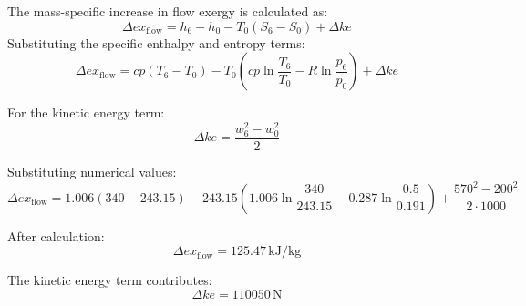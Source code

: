 The mass-specific increase in flow exergy is calculated as:  
\[
\Delta ex_{\text{flow}} = h_6 - h_0 - T_0(S_6 - S_0) + \Delta ke
\]  
Substituting the specific enthalpy and entropy terms:  
\[
\Delta ex_{\text{flow}} = cp(T_6 - T_0) - T_0 \left( cp \ln \frac{T_6}{T_0} - R \ln \frac{p_6}{p_0} \right) + \Delta ke
\]  

For the kinetic energy term:  
\[
\Delta ke = \frac{w_6^2 - w_0^2}{2}
\]  

Substituting numerical values:  
\[
\Delta ex_{\text{flow}} = 1.006(340 - 243.15) - 243.15 \left( 1.006 \ln \frac{340}{243.15} - 0.287 \ln \frac{0.5}{0.191} \right) + \frac{570^2 - 200^2}{2 \cdot 1000}
\]  

After calculation:  
\[
\Delta ex_{\text{flow}} = 125.47 \, \text{kJ/kg}
\]  

The kinetic energy term contributes:  
\[
\Delta ke = 110050 \, \text{N}
\]